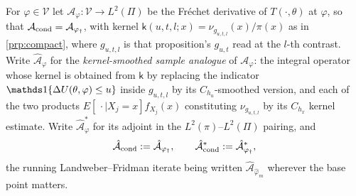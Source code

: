 \begin{definition}\label{def:hatA}
For $\varphi\in\mathcal V$ let $\mathcal A_\varphi:\mathcal V\to L^{2}(\Pi)$ be the Fr\'echet derivative of
$T(\cdot,\theta)$ at $\varphi$, so that $\mathcal A_{\mathrm{cond}}=\mathcal A_{\varphi_{\dagger}}$, with kernel
$\mathsf k(u,t,l;x)=\nu_{g_{u,t,l}}(x)/\pi(x)$ as in \cref{prp:compact}, where
$g_{u,t,l}$ is that proposition's $g_{u,t}$ read at the $l$-th contrast.
Write $\hat{\mathcal A}_\varphi$ for
the \emph{kernel-smoothed sample analogue} of $\mathcal A_\varphi$: the integral operator whose kernel is
obtained from $\mathsf k$ by replacing the indicator $\un\{\Delta U(\theta,\varphi)\le u\}$ inside
$g_{u,t,l}$ by its $C_{h_u}$-smoothed version, and each of the two products
$E[\,\cdot\mid X_j=x]f_{X_j}(x)$ constituting $\nu_{g_{u,t,l}}$ by its $C_{h_x}$ kernel estimate. Write
$\hat{\mathcal A}^\ast_\varphi$ for its adjoint in the $L^{2}(\pi)$--$L^{2}(\Pi)$ pairing, and
\[
\hat{\mathcal A}_{\mathrm{cond}}:=\hat{\mathcal A}_{\varphi_{\dagger}},
\qquad
\hat{\mathcal A}^\ast_{\mathrm{cond}}:=\hat{\mathcal A}^\ast_{\varphi_{\dagger}},
\]
the running Landweber--Fridman iterate being written $\hat{\mathcal A}_{\hat\varphi_m}$ wherever the base
point matters.

\end{definition}



